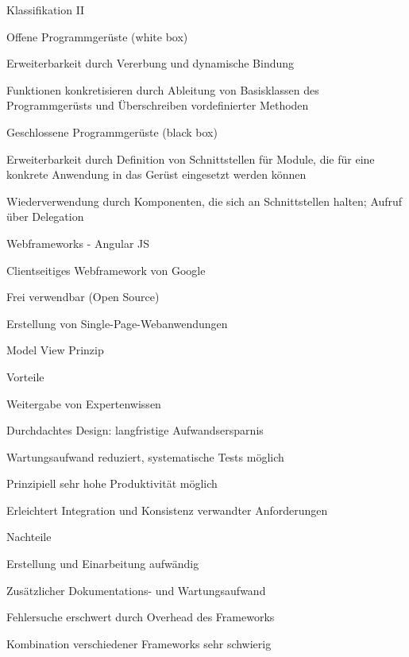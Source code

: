 \documentclass[a4paper]{article}
\begin{document}
\begin{multicols}{3}
  Klassifikation II
  \begin{itemize*}
    \item Offene Programmgerüste (white box)
    \begin{itemize*}
      \item Erweiterbarkeit durch Vererbung und dynamische Bindung
      \item Funktionen konkretisieren durch Ableitung von Basisklassen des Programmgerüsts und Überschreiben vordefinierter Methoden
    \end{itemize*}
    \item Geschlossene Programmgerüste (black box)
    \begin{itemize*}
      \item Erweiterbarkeit durch Definition von Schnittstellen für Module, die für eine konkrete Anwendung in das Gerüst eingesetzt werden können
      \item Wiederverwendung durch Komponenten, die sich an Schnittstellen halten; Aufruf über Delegation
    \end{itemize*}
  \end{itemize*}


  Webframeworks - Angular JS
  \begin{itemize*}
    \item Clientseitiges Webframework von Google
    \item Frei verwendbar (Open Source)
    \item Erstellung von Single-Page-Webanwendungen
    \item Model View Prinzip
  \end{itemize*}

  \begin{itemize*}
    \item Vorteile
    \begin{itemize*}
      \item Weitergabe von Expertenwissen
      \item Durchdachtes Design: langfristige Aufwandsersparnis
      \item Wartungsaufwand reduziert, systematische Tests möglich
      \item Prinzipiell sehr hohe Produktivität möglich
      \item Erleichtert Integration und Konsistenz verwandter Anforderungen
    \end{itemize*}
    \item Nachteile
    \begin{itemize*}
      \item Erstellung und Einarbeitung aufwändig
      \item Zusätzlicher Dokumentations- und Wartungsaufwand
      \item Fehlersuche erschwert durch Overhead des Frameworks
      \item Kombination verschiedener Frameworks sehr schwierig
    \end{itemize*}
  \end{itemize*}


\end{multicols}
\end{document}
